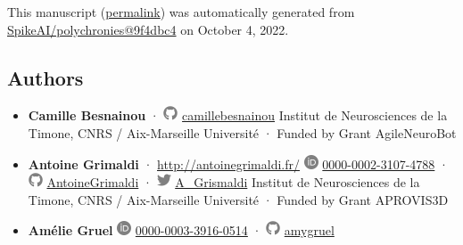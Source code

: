 This manuscript
(\href{https://SpikeAI.github.io/polychronies/v/9f4dbc4083cc349bedef79375849d649d7300fd4/}{permalink})
was automatically generated
from \href{https://github.com/SpikeAI/polychronies/tree/9f4dbc4083cc349bedef79375849d649d7300fd4}{SpikeAI/polychronies@9f4dbc4}
on October 4, 2022.

\hypertarget{authors}{%
\subsection{Authors}\label{authors}}

\begin{itemize}
\item
  \textbf{Camille Besnainou}
  · \includegraphics[width=0.16667in,height=0.16667in]{images/github.svg}
  \href{https://github.com/camillebesnainou}{camillebesnainou}
  Institut de Neurosciences de la Timone, CNRS / Aix-Marseille Université
  · Funded by Grant AgileNeuroBot
\item
  \textbf{Antoine Grimaldi}
  · \url{http://antoinegrimaldi.fr/}
  \includegraphics[width=0.16667in,height=0.16667in]{images/orcid.svg}
  \href{https://orcid.org/0000-0002-3107-4788}{0000-0002-3107-4788}
  · \includegraphics[width=0.16667in,height=0.16667in]{images/github.svg}
  \href{https://github.com/AntoineGrimaldi}{AntoineGrimaldi}
  · \includegraphics[width=0.16667in,height=0.16667in]{images/twitter.svg}
  \href{https://twitter.com/A_Grismaldi}{A\_Grismaldi}
  Institut de Neurosciences de la Timone, CNRS / Aix-Marseille Université
  · Funded by Grant APROVIS3D
\item
  \textbf{Amélie Gruel}
  \includegraphics[width=0.16667in,height=0.16667in]{images/orcid.svg}
  \href{https://orcid.org/0000-0003-3916-0514}{0000-0003-3916-0514}
  · \includegraphics[width=0.16667in,height=0.16667in]{images/github.svg}
  \href{https://github.com/amygruel}{amygruel}

\end{itemize}
